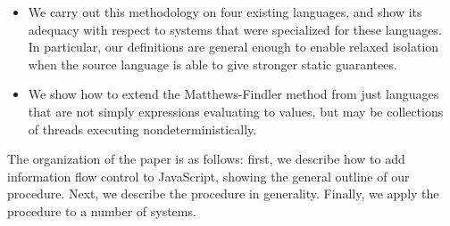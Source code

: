 {\begin{itemize}
    \item We carry out this methodology on four existing languages, and
        show its adequacy with respect to systems that were specialized
        for these languages.  In particular, our definitions are general
        enough to enable relaxed isolation when the source language is
        able to give stronger static guarantees.

    \item We show how to extend the Matthews-Findler method from just
        languages that are not simply expressions evaluating to values,
        but may be collections of threads executing nondeterministically.
\end{itemize}

The organization of the paper is as follows: first, we describe how to
add information flow control to JavaScript, showing the general outline of
our procedure. Next, we describe the procedure in generality.  Finally, we
apply the procedure to a number of systems.
}
